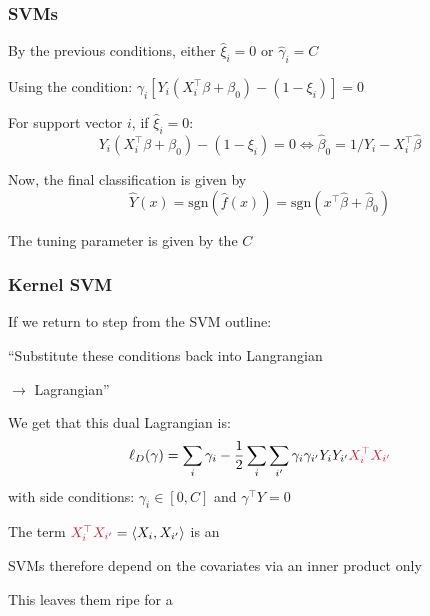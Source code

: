 \documentclass[12pt]{beamer}
\begin{document}
\begin{frame}
\frametitle{SVMs}
By the previous conditions, either $\hat\xi_i = 0$ or $\hat\gamma_i = C$ 

\vsp
Using the condition: $\gamma_i[Y_i(X_i^{\top} \beta +\beta_0) - (1-\xi_i)]  = 0$

\vsp
For support vector $i$, if $\hat\xi_i = 0$:
\[
Y_i(X_i^{\top} \beta +\beta_0) - (1-\xi_i) = 0 \Leftrightarrow  \hat\beta_0 = 1/Y_i - X_i^{\top} \hat\beta
\]



\vsp
Now, the final classification is given by
\[
\hat{Y}(x) = \textrm{sgn}(\hat{f}(x)) =  \textrm{sgn}(x^{\top}\hat\beta + \hat\beta_0)
\]

\vsp
The tuning parameter is given by the  $C$
\end{frame}

\begin{frame}
\frametitle{Kernel SVM}
If we return to step  from the SVM outline:

\vsp
``Substitute these conditions back into  Langrangian 

$\longrightarrow$  Lagrangian''

\vsp
We get that this dual Lagrangian is:
\[
\ell_D(\gamma) = \sum_i \gamma_i - \frac{1}{2}\sum_i \sum_{i'} \gamma_i \gamma_{i'} Y_i Y_{i'} \alr{X_i^{\top}X_{i'}}
\]
with side conditions: $\gamma_i \in [0,C]$ and $\gamma^{\top}Y = 0$

\vsp
The term $\alr{X_i^{\top}X_{i'}} = \langle X_i, X_{i'} \rangle$ is an 

\vsp
SVMs therefore depend on the covariates via an inner product only

\vsp
This leaves them ripe for a 
\end{frame}

\end{document}
